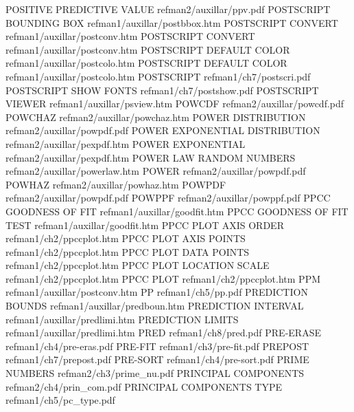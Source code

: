 POSITIVE PREDICTIVE VALUE               refman2/auxillar/ppv.pdf
POSTSCRIPT BOUNDING BOX                 refman1/auxillar/postbbox.htm
POSTSCRIPT CONVERT                      refman1/auxillar/postconv.htm
POSTSCRIPT CONVERT                      refman1/auxillar/postconv.htm
POSTSCRIPT DEFAULT COLOR                refman1/auxillar/postcolo.htm
POSTSCRIPT DEFAULT COLOR                refman1/auxillar/postcolo.htm
POSTSCRIPT                              refman1/ch7/postscri.pdf
POSTSCRIPT SHOW FONTS                   refman1/ch7/postshow.pdf
POSTSCRIPT VIEWER                       refman1/auxillar/psview.htm
POWCDF                                  refman2/auxillar/powcdf.pdf
POWCHAZ                                 refman2/auxillar/powchaz.htm
POWER DISTRIBUTION                      refman2/auxillar/powpdf.pdf
POWER EXPONENTIAL DISTRIBUTION          refman2/auxillar/pexpdf.htm
POWER EXPONENTIAL                       refman2/auxillar/pexpdf.htm
POWER LAW RANDOM NUMBERS                refman2/auxillar/powerlaw.htm
POWER                                   refman2/auxillar/powpdf.pdf
POWHAZ                                  refman2/auxillar/powhaz.htm
POWPDF                                  refman2/auxillar/powpdf.pdf
POWPPF                                  refman2/auxillar/powppf.pdf
PPCC GOODNESS OF FIT                    refman1/auxillar/goodfit.htm
PPCC GOODNESS OF FIT TEST               refman1/auxillar/goodfit.htm
PPCC PLOT AXIS ORDER                    refman1/ch2/ppccplot.htm
PPCC PLOT AXIS POINTS                   refman1/ch2/ppccplot.htm
PPCC PLOT DATA POINTS                   refman1/ch2/ppccplot.htm
PPCC PLOT LOCATION SCALE                refman1/ch2/ppccplot.htm
PPCC PLOT                               refman1/ch2/ppccplot.htm
PPM                                     refman1/auxillar/postconv.htm
PP                                      refman1/ch5/pp.pdf
PREDICTION BOUNDS                       refman1/auxillar/predboun.htm
PREDICTION INTERVAL                     refman1/auxillar/predlimi.htm
PREDICTION LIMITS                       refman1/auxillar/predlimi.htm
PRED                                    refman1/ch8/pred.pdf
PRE-ERASE                               refman1/ch4/pre-eras.pdf
PRE-FIT                                 refman1/ch3/pre-fit.pdf
PREPOST                                 refman1/ch7/prepost.pdf
PRE-SORT                                refman1/ch4/pre-sort.pdf
PRIME NUMBERS                           refman2/ch3/prime_nu.pdf
PRINCIPAL COMPONENTS                    refman2/ch4/prin_com.pdf
PRINCIPAL COMPONENTS TYPE               refman1/ch5/pc_type.pdf
